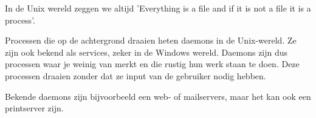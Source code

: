 In de Unix wereld zeggen we altijd 'Everything is a file and if it is not a file it is a process'.

Processen die op de achtergrond draaien heten daemons in de Unix-wereld. Ze zijn ook bekend als services, zeker in de Windows wereld. Daemons zijn dus processen waar je weinig van merkt en die rustig hun werk staan te doen. Deze processen draaien zonder dat ze input van de gebruiker nodig hebben.

Bekende daemons zijn bijvoorbeeld een web- of mailservers, maar het kan ook een printserver zijn.

